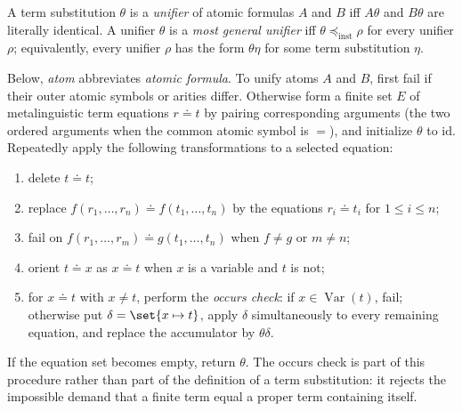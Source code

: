 \begin{definition}
A term substitution \(\theta\) is a \emph{unifier} of atomic formulas
\(A\) and \(B\) iff \(A\theta\) and \(B\theta\) are literally identical.
A unifier \(\theta\) is a \emph{most general unifier} iff
\(\theta\preceq_{\mathrm{inst}}\rho\) for every unifier \(\rho\); equivalently, every
unifier \(\rho\) has the form \(\theta\eta\) for some term substitution
\(\eta\).
\end{definition}

\begin{definition}
Below, \emph{atom} abbreviates \emph{atomic formula}.  To unify atoms
\(A\) and \(B\), first fail if their outer atomic symbols or
arities differ.  Otherwise form a finite set \(E\) of metalinguistic term
equations \(r\doteq t\) by pairing corresponding arguments (the two ordered
arguments when the common atomic symbol is \(=\)), and initialize
\(\theta\) to \(\mathrm{id}\).  Repeatedly apply the following transformations
to a selected equation:
\begin{enumerate}
  \item delete \(t\doteq t\);
  \item replace
        \(f(r_1,\ldots,r_n)\doteq f(t_1,\ldots,t_n)\) by the equations
        \(r_i\doteq t_i\) for \(1\leq i\leq n\);
  \item fail on
        \(f(r_1,\ldots,r_m)\doteq g(t_1,\ldots,t_n)\) when
        \(f\ne g\) or \(m\ne n\);
  \item orient \(t\doteq x\) as \(x\doteq t\) when \(x\) is a variable
        and \(t\) is not;
  \item for \(x\doteq t\) with \(x\ne t\), perform the \emph{occurs
        check}: if \(x\in\operatorname{Var}(t)\), fail; otherwise put
        \(\delta=\set{x\mapsto t}\), apply \(\delta\) simultaneously to
        every remaining equation, and replace the accumulator by
        \(\theta\delta\).
\end{enumerate}
If the equation set becomes empty, return \(\theta\).  The occurs check is
part of this procedure rather than part of the definition of a term
substitution: it rejects the impossible demand that a finite term equal a
proper term containing itself.
\end{definition}


